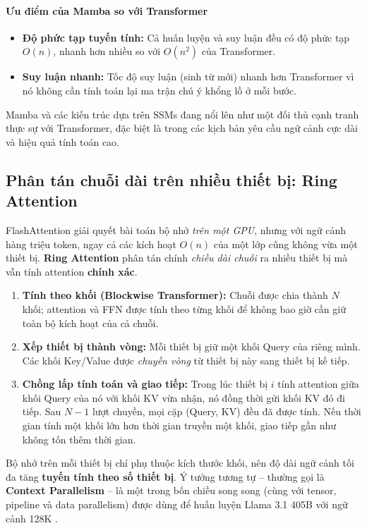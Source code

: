 \paragraph{Ưu điểm của Mamba so với Transformer}
\begin{itemize}
    \item \textbf{Độ phức tạp tuyến tính:} Cả huấn luyện và suy luận đều có độ phức tạp $O(n)$, nhanh hơn nhiều so với $O(n^2)$ của Transformer.
    \item \textbf{Suy luận nhanh:} Tốc độ suy luận (sinh từ mới) nhanh hơn Transformer vì nó không cần tính toán lại ma trận chú ý khổng lồ ở mỗi bước.
\end{itemize}
Mamba và các kiến trúc dựa trên SSMs đang nổi lên như một đối thủ cạnh tranh thực sự với Transformer, đặc biệt là trong các kịch bản yêu cầu ngữ cảnh cực dài và hiệu quả tính toán cao.

\subsection{Phân tán chuỗi dài trên nhiều thiết bị: Ring Attention}
\label{ssec:ring_attention}
FlashAttention giải quyết bài toán bộ nhớ \emph{trên một GPU}, nhưng với ngữ cảnh hàng triệu token, ngay cả các kích hoạt $O(n)$ của một lớp cũng không vừa một thiết bị. \textbf{Ring Attention} \cite{liu2023ring} phân tán chính \emph{chiều dài chuỗi} ra nhiều thiết bị mà vẫn tính attention \textbf{chính xác}.

\begin{enumerate}
	\item \textbf{Tính theo khối (Blockwise Transformer):} Chuỗi được chia thành $N$ khối; attention và FFN được tính theo từng khối để không bao giờ cần giữ toàn bộ kích hoạt của cả chuỗi.
	\item \textbf{Xếp thiết bị thành vòng:} Mỗi thiết bị giữ một khối Query của riêng mình. Các khối Key/Value được \emph{chuyền vòng} từ thiết bị này sang thiết bị kế tiếp.
	\item \textbf{Chồng lấp tính toán và giao tiếp:} Trong lúc thiết bị $i$ tính attention giữa khối Query của nó với khối KV vừa nhận, nó đồng thời gửi khối KV đó đi tiếp. Sau $N-1$ lượt chuyền, mọi cặp (Query, KV) đều đã được tính. Nếu thời gian tính một khối lớn hơn thời gian truyền một khối, giao tiếp gần như không tốn thêm thời gian.
\end{enumerate}
Bộ nhớ trên mỗi thiết bị chỉ phụ thuộc kích thước khối, nên độ dài ngữ cảnh tối đa tăng \textbf{tuyến tính theo số thiết bị}. Ý tưởng tương tự -- thường gọi là \textbf{Context Parallelism} -- là một trong bốn chiều song song (cùng với tensor, pipeline và data parallelism) được dùng để huấn luyện Llama 3.1 405B với ngữ cảnh 128K \cite{grattafiori2024llama3}.

